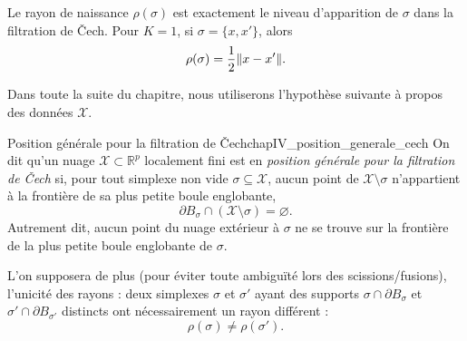 Le rayon de naissance $\rho(\sigma)$ est exactement le niveau d'apparition de $\sigma$ dans la filtration de \v Cech. Pour $K=1$, si $\sigma=\{x,x'\}$, alors
\[
    \rho(\sigma)=\frac12\lVert x-x' \rVert.
\]

Dans toute la suite du chapitre, nous utiliserons l'hypothèse suivante à propos des données $\mathcal X$. %

\begin{Definition}{Position générale pour la filtration de \v Cech}{chapIV_position_generale_cech}
On dit qu'un nuage $\mathcal X\subset \mathbb R^p$ localement fini est en \emph{position générale pour la filtration de \v Cech} si, pour tout simplexe non vide $\sigma\subseteq\mathcal X$,
aucun point de $\mathcal X\setminus\sigma$ n'appartient à la frontière de sa plus petite boule englobante,
    \[
        \partial B_\sigma\cap(\mathcal X\setminus\sigma)=\varnothing.
    \]
Autrement dit, aucun point du nuage extérieur à $\sigma$ ne se trouve sur
la frontière de la plus petite boule englobante de $\sigma$.


L'on supposera de plus (pour éviter toute ambiguïté lors des scissions/fusions), l'unicité des rayons : deux simplexes $\sigma$ et $\sigma'$ ayant des supports $\sigma\cap\partial B_\sigma$ et $\sigma'\cap\partial B_{\sigma'}$ distincts ont nécessairement un rayon différent :
\[
\rho(\sigma) \ne \rho(\sigma').
\]
\end{Definition}


